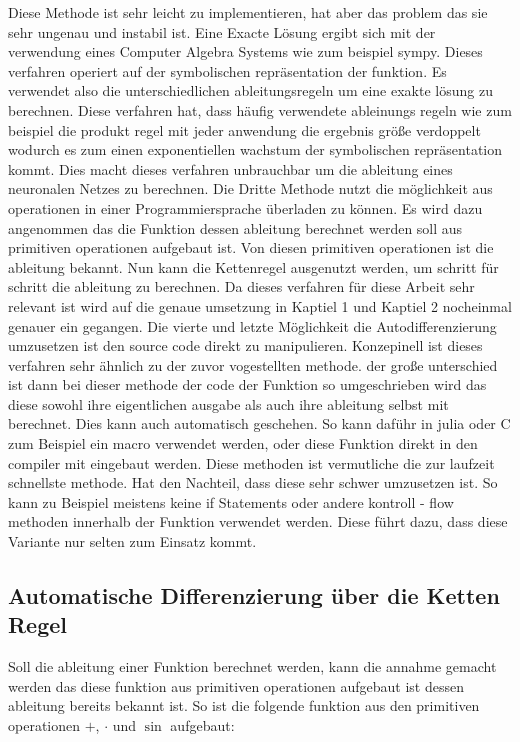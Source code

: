 Diese Methode ist sehr leicht zu implementieren, hat aber das problem das sie sehr ungenau und instabil ist.
Eine Exacte Lösung ergibt sich mit der verwendung eines Computer Algebra Systems wie zum beispiel sympy.
Dieses verfahren operiert auf der symbolischen repräsentation der funktion.
Es verwendet also die unterschiedlichen ableitungsregeln um eine exakte lösung zu berechnen.
Diese verfahren hat, dass häufig verwendete ableinungs regeln wie zum beispiel die produkt regel
mit jeder anwendung die ergebnis größe verdoppelt wodurch es zum einen exponentiellen wachstum 
der symbolischen repräsentation kommt.
Dies macht dieses verfahren unbrauchbar um die ableitung eines neuronalen Netzes zu berechnen.
Die Dritte Methode nutzt die möglichkeit aus operationen 
in einer Programmiersprache überladen zu können.
Es wird dazu angenommen das die Funktion dessen ableitung berechnet werden soll aus primitiven operationen aufgebaut ist.
Von diesen primitiven operationen ist die ableitung bekannt.
Nun kann die Kettenregel ausgenutzt werden, um schritt für schritt die ableitung zu berechnen.
Da dieses verfahren für diese Arbeit sehr relevant ist wird auf die genaue umsetzung in Kaptiel 1 und Kaptiel 2 nocheinmal genauer ein gegangen.
Die vierte und letzte Möglichkeit die Autodifferenzierung umzusetzen ist den source code direkt zu manipulieren.
Konzepinell ist dieses verfahren sehr ähnlich zu der zuvor vogestellten methode. der große unterschied ist dann bei dieser methode der code der Funktion so umgeschrieben wird das diese sowohl ihre eigentlichen ausgabe als auch ihre ableitung selbst mit berechnet.
Dies kann auch automatisch geschehen.
So kann daführ in julia oder C zum Beispiel ein macro verwendet werden, oder diese Funktion direkt in den compiler mit eingebaut werden.
Diese methoden ist vermutliche die zur laufzeit schnellste methode.
Hat den Nachteil, dass diese sehr schwer umzusetzen ist.
So kann zu Beispiel meistens keine if Statements oder andere kontroll - flow methoden innerhalb der Funktion verwendet werden. 
Diese führt dazu, dass diese Variante nur selten zum Einsatz kommt.

\subsection{Automatische Differenzierung über die Ketten Regel} \label{sec:ketten_regel}

Soll die ableitung einer Funktion berechnet werden, kann die annahme gemacht werden das diese funktion aus primitiven operationen aufgebaut ist dessen ableitung bereits bekannt ist.
So ist die folgende funktion aus den primitiven operationen $+$, $\cdot$  und $\sin$ aufgebaut:

